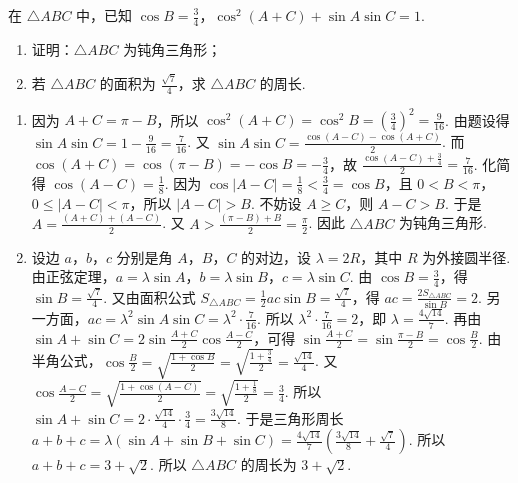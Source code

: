 \begin{problem}
在 \(\triangle ABC\) 中，已知 \(\cos B=\frac{3}{4}\)，\(\cos^2\left( A+C \right)+\sin A\sin C=1\).

\begin{enumerate}
\item 证明：\(\triangle ABC\) 为钝角三角形；
\item 若 \(\triangle ABC\) 的面积为 \(\frac{\sqrt{7}}{4}\)，求 \(\triangle ABC\) 的周长.
\end{enumerate}
\end{problem}

\begin{solution}
\begin{enumerate}
\item 因为 \(A+C=\pi-B\)，所以 \(\cos^2\left( A+C \right)=\cos^2 B=\left( \frac{3}{4} \right)^2=\frac{9}{16}\). 由题设得 \(\sin A\sin C=1-\frac{9}{16}=\frac{7}{16}\).
又 \(\sin A\sin C=\frac{\cos\left( A-C \right)-\cos\left( A+C \right)}{2}\). 而 \(\cos\left( A+C \right)=\cos\left( \pi-B \right)=-\cos B=-\frac{3}{4}\)，故 \(\frac{\cos\left( A-C \right)+\frac{3}{4}}{2}=\frac{7}{16}\). 化简得 \(\cos\left( A-C \right)=\frac{1}{8}\).
因为 \(\cos\left| A-C \right|=\frac{1}{8}<\frac{3}{4}=\cos B\)，且 \(0<B<\pi\)，\(0\le \left| A-C \right|<\pi\)，所以 \(\left| A-C \right|>B\). 不妨设 \(A\ge C\)，则 \(A-C>B\). 于是 \(A=\frac{\left( A+C \right)+\left( A-C \right)}{2}\). 又 \(A>\frac{\left( \pi-B \right)+B}{2}=\frac{\pi}{2}\).
因此 \(\triangle ABC\) 为钝角三角形.

\item 设边 \(a\)，\(b\)，\(c\) 分别是角 \(A\)，\(B\)，\(C\) 的对边，设 \(\lambda=2R\)，其中 \(R\) 为外接圆半径. 由正弦定理，\(a=\lambda \sin A\)，\(b=\lambda \sin B\)，\(c=\lambda \sin C\).
由 \(\cos B=\frac{3}{4}\)，得 \(\sin B=\frac{\sqrt{7}}{4}\). 又由面积公式 \(S_{\triangle ABC}=\frac{1}{2}ac\sin B=\frac{\sqrt{7}}{4}\)，得 \(ac=\frac{2S_{\triangle ABC}}{\sin B}=2\). 另一方面，\(ac=\lambda^2\sin A\sin C=\lambda^2\cdot \frac{7}{16}\). 所以 \(\lambda^2\cdot \frac{7}{16}=2\)，即 \(\lambda=\frac{4\sqrt{14}}{7}\).
再由 \(\sin A+\sin C=2\sin \frac{A+C}{2}\cos \frac{A-C}{2}\)，可得 \(\sin \frac{A+C}{2}=\sin \frac{\pi-B}{2}=\cos \frac{B}{2}\). 由半角公式，\(\cos \frac{B}{2}=\sqrt{\frac{1+\cos B}{2}}=\sqrt{\frac{1+\frac{3}{4}}{2}}=\frac{\sqrt{14}}{4}\). 又 \(\cos \frac{A-C}{2}=\sqrt{\frac{1+\cos\left( A-C \right)}{2}}=\sqrt{\frac{1+\frac{1}{8}}{2}}=\frac{3}{4}\). 所以 \(\sin A+\sin C=2\cdot \frac{\sqrt{14}}{4}\cdot \frac{3}{4}=\frac{3\sqrt{14}}{8}\).
于是三角形周长 \(a+b+c=\lambda\left( \sin A+\sin B+\sin C \right)=\frac{4\sqrt{14}}{7}\left( \frac{3\sqrt{14}}{8}+\frac{\sqrt{7}}{4} \right)\). 所以 \(a+b+c=3+\sqrt{2}\).
所以 \(\triangle ABC\) 的周长为 \(3+\sqrt{2}\).
\end{enumerate}
\end{solution}

